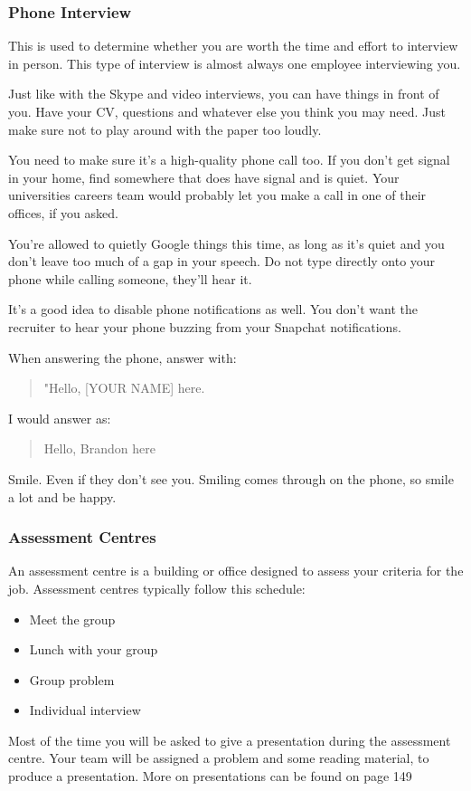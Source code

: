 \documentclass{article}
\begin{document}
\subsubsection{Phone Interview}
This is used to determine whether you are worth the time and effort to
interview in person. This type of interview is almost always one
employee interviewing you.

Just like with the Skype and video interviews, you can have things in
front of you. Have your CV, questions and whatever else you think you
may need. Just make sure not to play around with the paper too loudly.

You need to make sure it's a high-quality phone call too. If you don't
get signal in your home, find somewhere that does have signal and is
quiet. Your universities careers team would probably let you make a call
in one of their offices, if you asked.

You're allowed to quietly Google things this time, as long as it's quiet
and you don't leave too much of a gap in your speech. Do not type
directly onto your phone while calling someone, they'll hear it.

It's a good idea to disable phone notifications as well. You don't want
the recruiter to hear your phone buzzing from your Snapchat
notifications.

When answering the phone, answer with:

\begin{quote}
    "Hello, [YOUR NAME] here.
\end{quote}
I would answer as:
\begin{quote}
    Hello, Brandon here
\end{quote}
Smile. Even if they don't see you. Smiling comes through on the phone,
so smile a lot and be happy.

\subsubsection{Assessment Centres}
An assessment centre is a building or office designed to assess your
criteria for the job. Assessment centres typically follow this schedule:

\begin{itemize}
\item
  Meet the group
\item
  Lunch with your group
\item
  Group problem
\item
  Individual interview
\end{itemize}
Most of the time you will be asked to give a presentation during the
assessment centre. Your team will be assigned a problem and some reading
material, to produce a presentation. More on presentations can be found
on page 149
\end{document}
